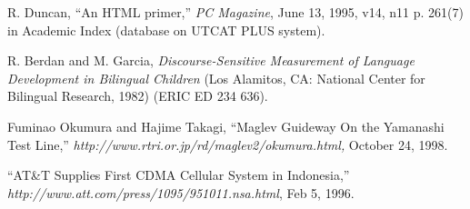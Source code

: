 {\begin{thebibliography}{}
R. Duncan, “An HTML primer,” \emph{PC Magazine}, June 13, 1995, v14, n11 p. 261(7) in Academic Index (database on UTCAT PLUS system).

R. Berdan and M. Garcia, \emph{Discourse-Sensitive Measurement of Language Development in Bilingual Children} (Los Alamitos, CA: National Center for
Bilingual Research, 1982) (ERIC ED 234 636).

Fuminao Okumura and Hajime Takagi, “Maglev Guideway On the Yamanashi Test Line,” \emph{http://www.rtri.or.jp/rd/maglev2/okumura.html,} October 24, 1998.

“AT\&T Supplies First CDMA Cellular System in Indonesia,” \emph{http://www.att.com/press/1095/951011.nsa.html}, Feb 5, 1996.

\end{thebibliography}  
}
